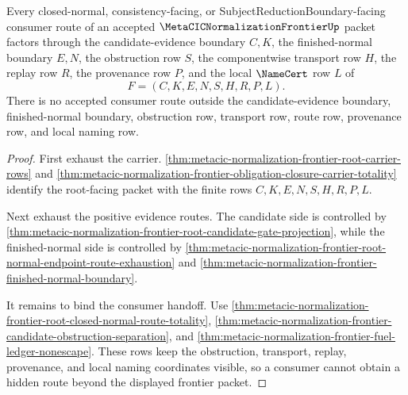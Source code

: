 \begin{theorem}
\label{thm:metacic-normalization-frontier-consumer-route-exhaustion}
Every closed-normal, consistency-facing, or SubjectReductionBoundary-facing consumer route of an accepted $\MetaCICNormalizationFrontierUp$ packet factors through the candidate-evidence boundary $C,K$, the finished-normal boundary $E,N$, the obstruction row $S$, the componentwise transport row $H$, the replay row $R$, the provenance row $P$, and the local $\NameCert$ row $L$ of
$$
F=(C,K,E,N,S,H,R,P,L).
$$
There is no accepted consumer route outside the candidate-evidence boundary, finished-normal boundary, obstruction row, transport row, route row, provenance row, and local naming row.
\end{theorem}
\begin{proof}
First exhaust the carrier. \autoref{thm:metacic-normalization-frontier-root-carrier-rows} and \autoref{thm:metacic-normalization-frontier-obligation-closure-carrier-totality} identify the root-facing packet with the finite rows $C,K,E,N,S,H,R,P,L$.

Next exhaust the positive evidence routes. The candidate side is controlled by \autoref{thm:metacic-normalization-frontier-root-candidate-gate-projection}, while the finished-normal side is controlled by \autoref{thm:metacic-normalization-frontier-root-normal-endpoint-route-exhaustion} and \autoref{thm:metacic-normalization-frontier-finished-normal-boundary}.

It remains to bind the consumer handoff. Use \autoref{thm:metacic-normalization-frontier-root-closed-normal-route-totality}, \autoref{thm:metacic-normalization-frontier-candidate-obstruction-separation}, and \autoref{thm:metacic-normalization-frontier-fuel-ledger-nonescape}. These rows keep the obstruction, transport, replay, provenance, and local naming coordinates visible, so a consumer cannot obtain a hidden route beyond the displayed frontier packet.
\end{proof}
